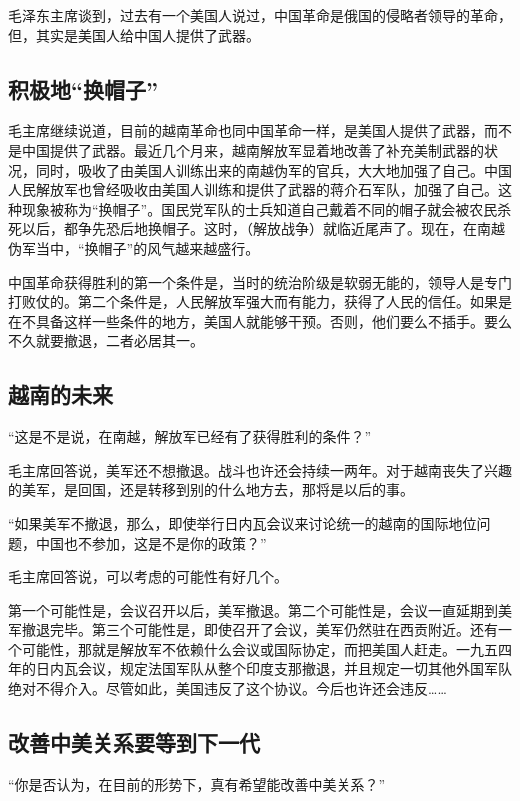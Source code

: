 毛泽东主席谈到，过去有一个美国人说过，中国革命是俄国的侵略者领导的革命，但，其实是美国人给中国人提供了武器。

\subsection{积极地“换帽子”}

毛主席继续说道，目前的越南革命也同中国革命一样，是美国人提供了武器，而不是中国提供了武器。最近几个月来，越南解放军显着地改善了补充美制武器的状况，同时，吸收了由美国人训练出来的南越伪军的官兵，大大地加强了自己。中国人民解放军也曾经吸收由美国人训练和提供了武器的蒋介石军队，加强了自己。这种现象被称为“换帽子”。国民党军队的士兵知道自己戴着不同的帽子就会被农民杀死以后，都争先恐后地换帽子。这时，（解放战争）就临近尾声了。现在，在南越伪军当中，“换帽子”的风气越来越盛行。

中国革命获得胜利的第一个条件是，当时的统治阶级是软弱无能的，领导人是专门打败仗的。第二个条件是，人民解放军强大而有能力，获得了人民的信任。如果是在不具备这样一些条件的地方，美国人就能够干预。否则，他们要么不插手。要么不久就要撤退，二者必居其一。

\subsection{越南的未来}

“这是不是说，在南越，解放军已经有了获得胜利的条件？”

毛主席回答说，美军还不想撤退。战斗也许还会持续一两年。对于越南丧失了兴趣的美军，是回国，还是转移到别的什么地方去，那将是以后的事。

“如果美军不撤退，那么，即使举行日内瓦会议来讨论统一的越南的国际地位问题，中国也不参加，这是不是你的政策？”

毛主席回答说，可以考虑的可能性有好几个。

第一个可能性是，会议召开以后，美军撤退。第二个可能性是，会议一直延期到美军撤退完毕。第三个可能性是，即使召开了会议，美军仍然驻在西贡附近。还有一个可能性，那就是解放军不依赖什么会议或国际协定，而把美国人赶走。一九五四年的日内瓦会议，规定法国军队从整个印度支那撤退，并且规定一切其他外国军队绝对不得介入。尽管如此，美国违反了这个协议。今后也许还会违反……

\subsection{改善中美关系要等到下一代}

“你是否认为，在目前的形势下，真有希望能改善中美关系？”

